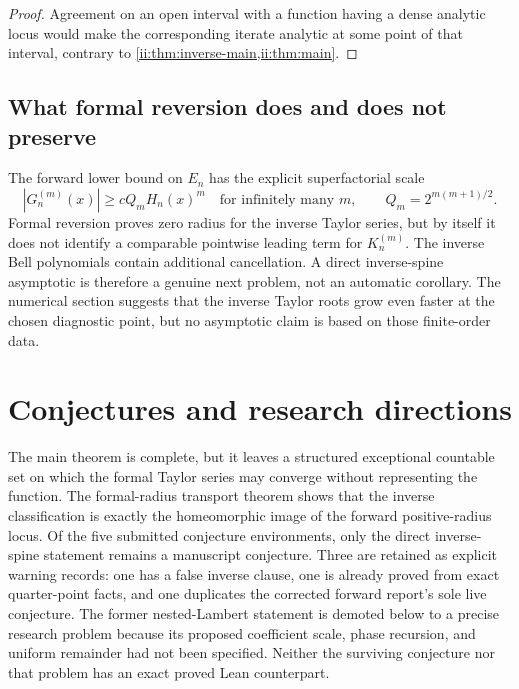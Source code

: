 \begin{proof}
Agreement on an open interval with a function having a dense analytic locus would make
the corresponding iterate analytic at some point of that interval, contrary to
\cref{ii:thm:inverse-main,ii:thm:main}.
\end{proof}

\subsection{What formal reversion does and does not preserve}

The forward lower bound on $E_n$ has the explicit superfactorial scale
\begin{equation}
 |G_n^{(m)}(x)|\geq cQ_mH_n(x)^m
 \quad\text{for infinitely many }m,
 \qquad Q_m=2^{m(m+1)/2}.
 \label{ii:eq:forward-growth-restated}
\end{equation}
Formal reversion proves zero radius for the inverse Taylor series, but by itself it does
not identify a comparable pointwise leading term for $K_n^{(m)}$.  The inverse Bell
polynomials contain additional cancellation.  A direct inverse-spine asymptotic is
therefore a genuine next problem, not an automatic corollary.  The numerical section
suggests that the inverse Taylor roots grow even faster at the chosen diagnostic point,
but no asymptotic claim is based on those finite-order data.

\section{Conjectures and research directions}
\label{ii:sec:future}

The main theorem is complete, but it leaves a structured exceptional countable set on
which the formal Taylor series may converge without representing the function.  The
formal-radius transport theorem shows that the inverse classification is exactly the
homeomorphic image of the forward positive-radius locus.  Of the five submitted
conjecture environments, only the direct inverse-spine statement remains a manuscript
conjecture.  Three are retained as explicit warning records: one has a false inverse
clause, one is already proved from exact quarter-point facts, and one duplicates the
corrected forward report's sole live conjecture.  The former nested-Lambert statement
is demoted below to a precise research problem because its proposed coefficient scale,
phase recursion, and uniform remainder had not been specified.  Neither the surviving
conjecture nor that problem has an exact proved Lean counterpart.

